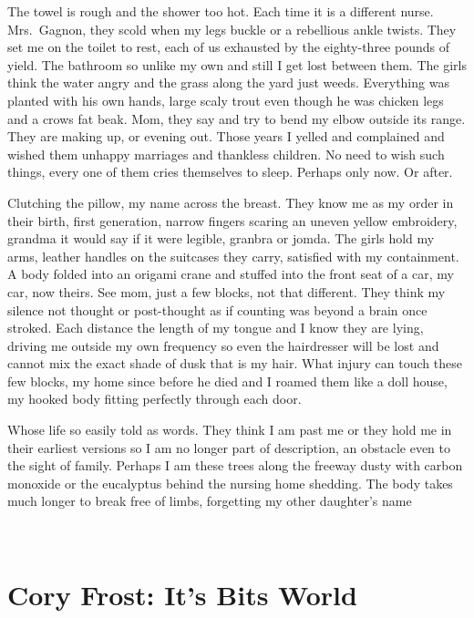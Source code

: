 \documentclass[
]{memoir}
\begin{document}
The towel is rough and the shower too hot. Each time it is a different
nurse. Mrs.~Gagnon, they scold when my legs buckle or a rebellious ankle
twists. They set me on the toilet to rest, each of us exhausted by the
eighty-three pounds of yield. The bathroom so unlike my own and still I
get lost between them. The girls think the water angry and the grass
along the yard just weeds. Everything was planted with his own hands,
large scaly trout even though he was chicken legs and a crows fat beak.
Mom, they say and try to bend my elbow outside its range. They are
making up, or evening out. Those years I yelled and complained and
wished them unhappy marriages and thankless children. No need to wish
such things, every one of them cries themselves to sleep. Perhaps only
now. Or after.

Clutching the pillow, my name across the breast. They know me as my
order in their birth, first generation, narrow fingers scaring an uneven
yellow embroidery, grandma it would say if it were legible, granbra or
jomda. The girls hold my arms, leather handles on the suitcases they
carry, satisfied with my containment. A body folded into an origami
crane and stuffed into the front seat of a car, my car, now theirs. See
mom, just a few blocks, not that different. They think my silence not
thought or post-thought as if counting was beyond a brain once stroked.
Each distance the length of my tongue and I know they are lying, driving
me outside my own frequency so even the hairdresser will be lost and
cannot mix the exact shade of dusk that is my hair. What injury can
touch these few blocks, my home since before he died and I roamed them
like a doll house, my hooked body fitting perfectly through each door.

Whose life so easily told as words. They think I am past me or they hold
me in their earliest versions so I am no longer part of description, an
obstacle even to the sight of family. Perhaps I am these trees along the
freeway dusty with carbon monoxide or the eucalyptus behind the nursing
home shedding. The body takes much longer to break free of limbs,
forgetting my other daughter's name

~

\hypertarget{cory-frost-its-bits-world}{%
\chapter{Cory Frost: It's Bits World}\label{cory-frost-its-bits-world}}

~
\end{document}
